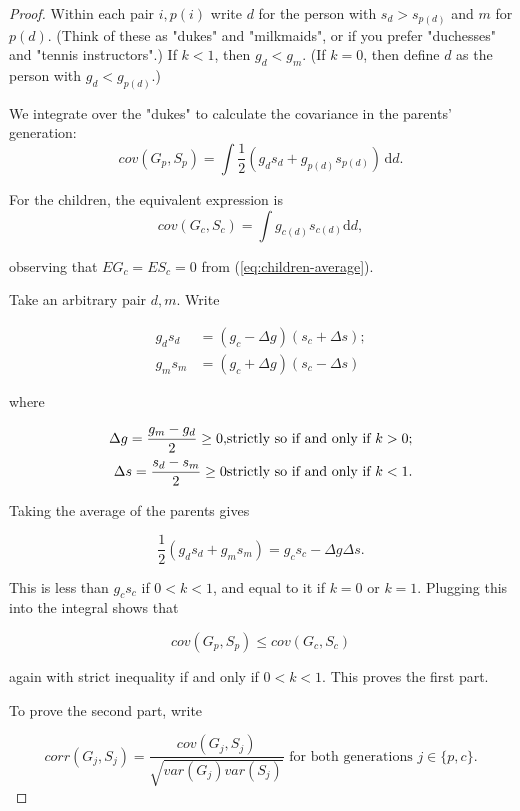 \documentclass[
]{article}
\begin{document}
\begin{proof}


Within each pair $i,p(i)$ write $d$ for the person with $s_{d}>s_{p(d)}$
and $m$ for $p(d)$. (Think of these as "dukes" and "milkmaids",
or if you prefer "duchesses" and "tennis instructors".) If
$k < 1$, then $g_{d} < g_{m}$. (If $k = 0$, then define $d$ as the person
with $g_{d} < g_{p(d)}$.)

We integrate over the "dukes" to calculate the covariance in the
parents' generation:
\[
cov(G_{p},S_{p})=\int\frac{1}{2}(g_{d}s_{d}+g_{p(d)}s_{p(d)})\,\mathrm{d}d.
\]

For the children, the equivalent expression is
\[
cov(G_{c},S_{c})=\int g_{c(d)}s_{c(d)}\mathrm{d}d,
\]

observing that $EG_{c} = ES_{c}=0$ from (\ref{eq:children-average}).

Take an arbitrary pair $d,m$. Write

\begin{align*}
g_{d}s_{d} & = (g_{c}-\Delta g)(s_{c}+\Delta s);\\
g_{m}s_{m} & = (g_{c}+\Delta g)(s_{c}-\Delta s)
\end{align*}

where 

\begin{align*}
\text{\ensuremath{\Delta g=\frac{g_{m}-g_{d}}{2}\ge0}}, & \textrm{strictly so if and only if }k>0;\\
\Delta s=\frac{s_{d}-s_{m}}{2}\ge0 & \textrm{strictly so if and only if }k<1.
\end{align*}

Taking the average of the parents gives

\[
\frac{1}{2}(g_{d}s_{d}+g_{m}s_{m})= g _{c}s_{c}-\Delta g\Delta s.
\]

This is less than $g_{c}s_{c}$ if $0 < k < 1$, and equal to it if $k = 0$
or $k = 1$. Plugging this into the integral shows that 

\[
cov(G_{p},S_{p})\le cov(G_{c},S_{c})
\]

again with strict inequality if and only if $0 < k < 1$. This proves the first
part. 

To prove the second part, write

\begin{equation}
corr(G_{j},S_{j})=\frac{cov(G_{j},S_{j})}{\sqrt{var(G_{j})var(S_{j})}}\textrm{ for both generations }j\in\{p,c\}.\label{eq:corr-cov-var}
\end{equation}


\end{proof}
\end{document}
